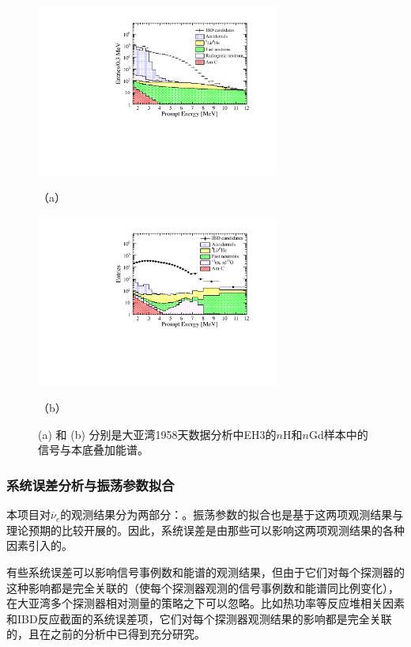 \documentclass[a4paper,zihao=-4]{article}
\begin{document}
\begin{figure}[!htb]
    \begin{minipage}[t]{0.5\linewidth}
    \centering
        \includegraphics[width=8cm]{spec_stack_EH3_best.pdf}
    \caption*{（a）}
    \end{minipage}
    \begin{minipage}[t]{0.5\linewidth}
    \centering
        \includegraphics[width=8cm]{nGd-bkg-EH3.pdf}
    \caption*{（b）}
    \end{minipage}
        \caption{(a) 和 (b) 分别是大亚湾1958天数据分析中EH3的$n$H和$n$Gd样本中的信号与本底叠加能谱。}
    \label{fig:nH-nGd-bkgs}
\end{figure}

\subsubsection{系统误差分析与振荡参数拟合}\label{sec:uncertainty}
本项目对$\overline{\nu}_e$的观测结果分为两部分：。振荡参数的拟合也是基于这两项观测结果与理论预期的比较开展的。因此，系统误差是由那些可以影响这两项观测结果的各种因素引入的。

有些系统误差可以影响信号事例数和能谱的观测结果，但由于它们对每个探测器的这种影响都是完全关联的（使每个探测器观测的信号事例数和能谱同比例变化），在大亚湾多个探测器相对测量的策略之下可以忽略。比如热功率等反应堆相关因素和IBD反应截面的系统误差项，它们对每个探测器观测结果的影响都是完全关联的，且在之前的分析中已得到充分研究。
\end{document}
